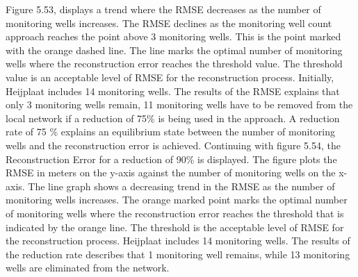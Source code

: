 Figure 5.53, displays a trend where the RMSE decreases as the number of monitoring wells increases. The RMSE declines as the monitoring well count approach reaches the point above 3 monitoring wells. This is the point marked with the orange dashed line. The line marks the optimal number of monitoring wells where the reconstruction error reaches the threshold value. The threshold value is an acceptable level of RMSE for the reconstruction process. Initially, Heijplaat includes 14 monitoring wells. The results of the RMSE explains that only 3 monitoring wells remain, 11 monitoring wells have to be removed from the local network if a reduction of 75\% is being used in the approach. A reduction rate of 75 \% explains an equilibrium state between the number of monitoring wells and the reconstruction error is achieved. 
\newline
Continuing with figure 5.54, the Reconstruction Error for a reduction of 90\% is displayed. The figure plots the RMSE in meters on the y-axis against the number of monitoring wells on the x-axis. The line graph shows a decreasing trend in the RMSE as the number of monitoring wells increases. The orange marked point marks the optimal number of monitoring wells where the reconstruction error reaches the threshold that is indicated by the orange line. The threshold is the acceptable level of RMSE for the reconstruction process. Heijplaat includes 14 monitoring wells. The results of the reduction rate describes that 1 monitoring well remains, while 13 monitoring wells are eliminated from the network.

